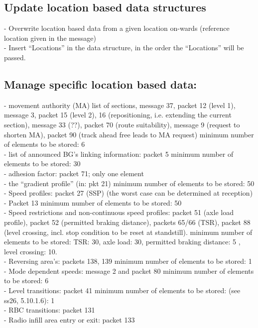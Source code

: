 \documentclass{template/openetcs_report}
\begin{document}
\subsection{Update location based data structures}
- Overwrite location based data from a given location on-wards (reference location given in the message)\\
- Insert “Locations” in the data structure, in the order the “Locations” will be passed.\\

\subsection{Manage specific location based data:}
- movement authority (MA) list of sections, message 37, packet 12 (level 1), message 3, packet 15 (level 2), 16 (repositioning, i.e. extending the current section), message 33 (??), packet 70 (route suitability), message 9 (request to shorten MA), packet 90 (track ahead free leads to MA request)    minimum number of elements to be stored: 6\\
- list of announced \gls{BG}'s linking information: packet 5  minimum number of elements to be stored: 30\\
- adhesion factor: packet 71;  only one element\\
- the “gradient profile” (in: pkt 21)  minimum number of elements to be stored: 50\\
- Speed profiles:  packet 27 (SSP)  (the worst case can be determined at reception)\\
- Packet 13	minimum number of elements to be stored: 50\\
- Speed restrictions and non-continuous speed profiles: packet 51 (axle load profile), packet 52 (permitted braking distance), packets 65/66 (TSR), packet 88 (level crossing, incl. stop condition to be reset at standstill). 
minimum number of elements to be stored: TSR: 30, axle load: 30, permitted braking distance:  5 , level crossing: 10. \\
- Reversing area's: packets 138, 139	minimum number of elements to be stored: 1\\
- Mode dependent speeds: message 2  and packet 80  minimum number of elements to be stored: 6\\
- Level transitions: packet 41  minimum number of elements to be stored:  (see ss26, 5.10.1.6): 1\\
- RBC transitions: packet 131\\
- Radio infill area entry or exit: packet 133\\
\end{document}
